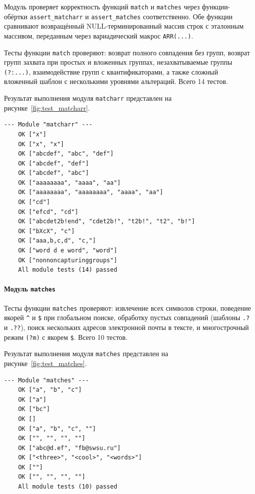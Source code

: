 Модуль проверяет корректность функций \verb`match` и \verb`matches` через функции-обёртки \verb`assert_matcharr` и \verb`assert_matches` соответственно. Обе функции сравнивают возвращённый NULL-терминированный массив строк с эталонным массивом, переданным через вариадический макрос \verb`ARR(...)`.

Тесты функции \verb`match` проверяют: возврат полного совпадения без групп, возврат групп захвата при простых и вложенных группах, незахватываемые группы \verb`(?:...)`, взаимодействие групп с квантификаторами, а также сложный вложенный шаблон с несколькими уровнями альтераций. Всего 14 тестов.

Результат выполнения модуля \verb`matcharr` представлен на рисунке~\ref{fig:test_matcharr}.

\begin{lstlisting}[caption={Результат выполнения модуля matcharr}, label={fig:test_matcharr}]
	--- Module "matcharr" ---
	OK ["x"]
	OK ["x", "x"]
	OK ["abcdef", "abc", "def"]
	OK ["abcdef", "def"]
	OK ["abcdef", "abc"]
	OK ["aaaaaaaa", "aaaa", "aa"]
	OK ["aaaaaaaa", "aaaaaaaa", "aaaa", "aa"]
	OK ["cd"]
	OK ["efcd", "cd"]
	OK ["abcdet2b!end", "cdet2b!", "t2b!", "t2", "b!"]
	OK ["bXcX", "c"]
	OK ["aaa,b,c,d", "c,"]
	OK ["word d e word", "word"]
	OK ["nonnoncapturinggroups"]
	All module tests (14) passed
\end{lstlisting}

\paragraph{Модуль \texttt{matches}}

Тесты функции \verb`matches` проверяют: извлечение всех символов строки, поведение якорей \verb`^` и \verb`$` при глобальном поиске, обработку пустых совпадений (шаблоны \verb`.?` и \verb`.??`), поиск нескольких адресов электронной почты в тексте, и многострочный режим \verb`(?m)` с якорем \verb`$`. Всего 10 тестов.

Результат выполнения модуля \verb`matches` представлен на рисунке~\ref{fig:test_matches}.

\begin{lstlisting}[caption={Результат выполнения модуля matches}, label={fig:test_matches}]
	--- Module "matches" ---
	OK ["a", "b", "c"]
	OK ["a"]
	OK ["bc"]
	OK []
	OK ["a", "b", "c", ""]
	OK ["", "", "", ""]
	OK ["abc@d.ef", "fb@swsu.ru"]
	OK ["<three>", "<cool>", "<words>"]
	OK [""]
	OK ["", "", "", ""]
	All module tests (10) passed
\end{lstlisting}

